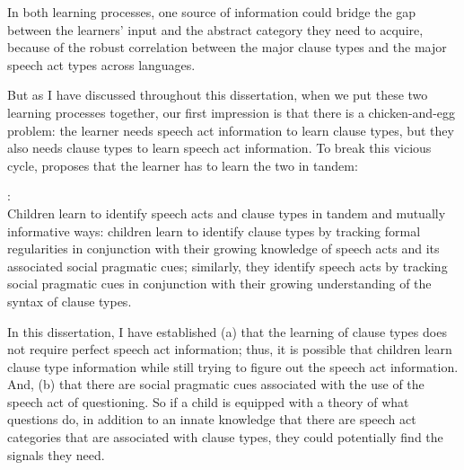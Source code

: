 In both learning processes, one source of information could bridge the gap between the learners' input and the abstract category they need to acquire, because of the robust correlation between the major clause types and the major speech act types across languages. 

But as I have discussed throughout this dissertation, when we put these two learning processes together, our first impression is that there is a chicken-and-egg problem: the learner needs speech act information to learn clause types, but they also needs clause types to learn speech act information. To break this vicious cycle, \hypos{} proposes that the learner has to learn the two in tandem:

\begin{exe}\ex\label{ex:prag-syn-hypo}
:\\
Children learn to identify speech acts and clause types in tandem and mutually informative ways: children learn to identify clause types by tracking formal regularities in conjunction with their growing knowledge of speech acts and its associated social pragmatic cues; similarly, they identify speech acts by tracking social pragmatic cues in conjunction with their growing understanding of the syntax of clause types. 
\end{exe} 

\begin{comment}


\bex{}
\ex
\begin{tikzpicture}[level distance=60pt]
\tikzset{every tree node/.style={align=center,anchor=north, font=\scriptsize}}
\tikzset{level 1/.style={level distance=35pt}}
\tikzset{level 2/.style={sibling distance=35pt}}
\Tree
[. {Sentential force} 
	[. {Clause type features\\ ([\textpm int, imp])} 
		[. {Surface formal features} ]
		[. {Prosodic features} ]
	]
	[. {Speech act categories \\
	\aqrs{}} 
		
		[. {Prosodic features} ]
		[. {Social pragmatic features} ]
	]
]

\end{tikzpicture}
\eex
\end{comment}


In this dissertation, I have established (a) that the learning of clause types does not require perfect speech act information; thus, it is possible that children learn clause type information while still trying to figure out the speech act information. And, (b) that there are social pragmatic cues associated with the use of the speech act of questioning. So if a child is equipped with a theory of what questions do, in addition to an innate knowledge that there are speech act categories that are associated with clause types, they could potentially find the signals they need.

